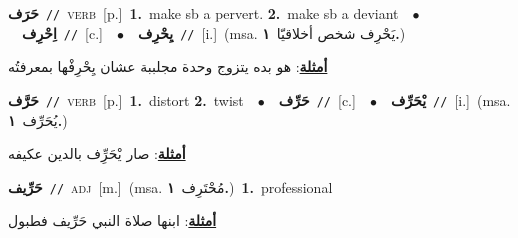 \documentclass[10pt,a4paper,twoside]{article} %
\begin{document}
\begin{multicols}{2}
{\setlength\topsep{0pt}\textbf{\foreignlanguage{arabic}{حَرَف}}\ {\color{gray}\texttt{//}\color{black}}\ \textsc{verb}\ [p.]\ \textbf{1.}~make sb a pervert.  \textbf{2.}~make sb a deviant\ \ $\bullet$\ \ \setlength\topsep{0pt}\textbf{\foreignlanguage{arabic}{اِحْرِف}}\ {\color{gray}\texttt{//}\color{black}}\ [c.]\ \ $\bullet$\ \ \setlength\topsep{0pt}\textbf{\foreignlanguage{arabic}{يِحْرِف}}\ {\color{gray}\texttt{//}\color{black}}\ [i.]\ \color{gray}(msa. \foreignlanguage{arabic}{يَحْرِف شخص أخلاقيّا}~\foreignlanguage{arabic}{\textbf{١.}})\color{black}\  \begin{flushright}\color{gray}\foreignlanguage{arabic}{\textbf{\underline{\foreignlanguage{arabic}{أمثلة}}}: هو بده يتزوج وحدة مجلببة عشان يِحْرِفْها بمعرفتُه}\end{flushright}\color{black}} \vspace{2mm}

{\setlength\topsep{0pt}\textbf{\foreignlanguage{arabic}{حَرَّف}}\ {\color{gray}\texttt{//}\color{black}}\ \textsc{verb}\ [p.]\ \textbf{1.}~distort  \textbf{2.}~twist\ \ $\bullet$\ \ \setlength\topsep{0pt}\textbf{\foreignlanguage{arabic}{حَرِّف}}\ {\color{gray}\texttt{//}\color{black}}\ [c.]\ \ $\bullet$\ \ \setlength\topsep{0pt}\textbf{\foreignlanguage{arabic}{يْحَرِّف}}\ {\color{gray}\texttt{//}\color{black}}\ [i.]\ \color{gray}(msa. \foreignlanguage{arabic}{يُحَرِّف}~\foreignlanguage{arabic}{\textbf{١.}})\color{black}\  \begin{flushright}\color{gray}\foreignlanguage{arabic}{\textbf{\underline{\foreignlanguage{arabic}{أمثلة}}}: صار يْحَرِِّف بالدين عكيفه}\end{flushright}\color{black}} \vspace{2mm}

{\setlength\topsep{0pt}\textbf{\foreignlanguage{arabic}{حَرِّيف}}\ {\color{gray}\texttt{//}\color{black}}\ \textsc{adj}\ [m.]\ \color{gray}(msa. \foreignlanguage{arabic}{مُحْتَرِف}~\foreignlanguage{arabic}{\textbf{١.}})\color{black}\ \textbf{1.}~professional\  \begin{flushright}\color{gray}\foreignlanguage{arabic}{\textbf{\underline{\foreignlanguage{arabic}{أمثلة}}}: ابنها صلاة النبي حَرِّيف فطبول}\end{flushright}\color{black}} \vspace{2mm}


\end{multicols}
\end{document}
